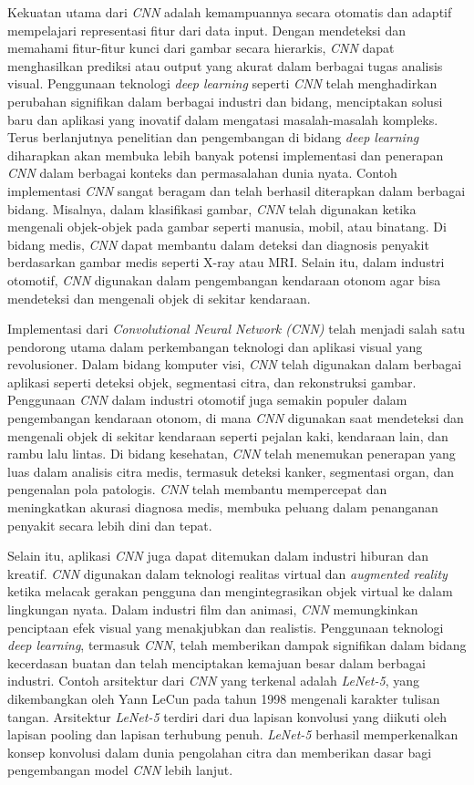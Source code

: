 Kekuatan utama dari \textit{CNN} adalah kemampuannya secara otomatis dan adaptif mempelajari representasi fitur dari data input. Dengan mendeteksi dan memahami fitur-fitur kunci dari gambar secara hierarkis, \textit{CNN} dapat menghasilkan prediksi atau output yang akurat dalam berbagai tugas analisis visual. Penggunaan teknologi \textit{deep learning} seperti \textit{CNN} telah menghadirkan perubahan signifikan dalam berbagai industri dan bidang, menciptakan solusi baru dan aplikasi yang inovatif dalam mengatasi masalah-masalah kompleks. Terus berlanjutnya penelitian dan pengembangan di bidang \textit{deep learning} diharapkan akan membuka lebih banyak potensi implementasi dan penerapan \textit{CNN} dalam berbagai konteks dan permasalahan dunia nyata. Contoh implementasi \textit{CNN} sangat beragam dan telah berhasil diterapkan dalam berbagai bidang. Misalnya, dalam klasifikasi gambar, \textit{CNN} telah digunakan ketika mengenali objek-objek pada gambar seperti manusia, mobil, atau binatang. Di bidang medis, \textit{CNN} dapat membantu dalam deteksi dan diagnosis penyakit berdasarkan gambar medis seperti X-ray atau MRI. Selain itu, dalam industri otomotif, \textit{CNN} digunakan dalam pengembangan kendaraan otonom agar bisa mendeteksi dan mengenali objek di sekitar kendaraan.

Implementasi dari \textit{Convolutional Neural Network (CNN)} telah menjadi salah satu pendorong utama dalam perkembangan teknologi dan aplikasi visual yang revolusioner. Dalam bidang komputer visi, \textit{CNN} telah digunakan dalam berbagai aplikasi seperti deteksi objek, segmentasi citra, dan rekonstruksi gambar. Penggunaan \textit{CNN} dalam industri otomotif juga semakin populer dalam pengembangan kendaraan otonom, di mana \textit{CNN} digunakan saat mendeteksi dan mengenali objek di sekitar kendaraan seperti pejalan kaki, kendaraan lain, dan rambu lalu lintas. Di bidang kesehatan, \textit{CNN} telah menemukan penerapan yang luas dalam analisis citra medis, termasuk deteksi kanker, segmentasi organ, dan pengenalan pola patologis. \textit{CNN} telah membantu mempercepat dan meningkatkan akurasi diagnosa medis, membuka peluang dalam penanganan penyakit secara lebih dini dan tepat.

Selain itu, aplikasi \textit{CNN} juga dapat ditemukan dalam industri hiburan dan kreatif. \textit{CNN} digunakan dalam teknologi realitas virtual dan \textit{augmented reality} ketika melacak gerakan pengguna dan mengintegrasikan objek virtual ke dalam lingkungan nyata. Dalam industri film dan animasi, \textit{CNN} memungkinkan penciptaan efek visual yang menakjubkan dan realistis. Penggunaan teknologi \textit{deep learning}, termasuk \textit{CNN}, telah memberikan dampak signifikan dalam bidang kecerdasan buatan dan telah menciptakan kemajuan besar dalam berbagai industri. Contoh arsitektur dari \textit{CNN} yang terkenal adalah \textit{LeNet-5}, yang dikembangkan oleh Yann LeCun pada tahun 1998 mengenali karakter tulisan tangan. Arsitektur \textit{LeNet-5} terdiri dari dua lapisan konvolusi yang diikuti oleh lapisan pooling dan lapisan terhubung penuh. \textit{LeNet-5} berhasil memperkenalkan konsep konvolusi dalam dunia pengolahan citra dan memberikan dasar bagi pengembangan model \textit{CNN} lebih lanjut.

